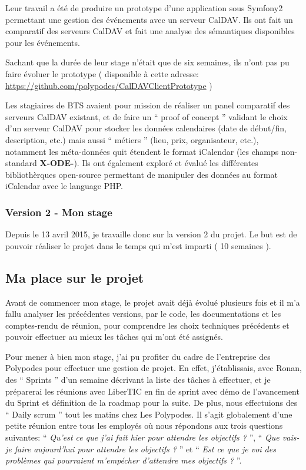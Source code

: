 Leur travail a été de produire un prototype d'une application sous Symfony2 permettant une gestion des événements avec un serveur CalDAV. Ils ont fait un comparatif des serveurs CalDAV et fait une analyse des sémantiques disponibles pour les événements.

Sachant que la durée de leur stage n'était que de six semaines, ils n'ont pas pu faire évoluer le prototype ( disponible à cette adresse: \url{https://github.com/polypodes/CalDAVClientPrototype} )

Les stagiaires de BTS avaient pour mission de réaliser un panel comparatif des serveurs CalDAV existant, et de faire un `` proof of concept '' validant le choix d'un serveur CalDAV pour stocker les données calendaires (date de début/fin, description, etc.) mais aussi `` métiers '' (lieu, prix, organisateur, etc.), notamment les méta-données quit étendent le format iCalendar (les champs non-standard \textbf{X-ODE-}). Ils ont également exploré et évalué les différentes bibliothèrques open-source permettant de manipuler des données au format iCalendar avec le language PHP.

\subsubsection*{Version 2 - Mon stage}

Depuis le 13 avril 2015, je travaille donc sur la version 2 du projet. Le but est de pouvoir réaliser le projet dans le temps qui m'est imparti ( 10 semaines ).

\subsection{Ma place sur le projet}

Avant de commencer mon stage, le projet avait déjà évolué plusieurs fois et il m'a fallu analyser les précédentes versions, par le code, les documentations et les comptes-rendu de réunion, pour comprendre les choix techniques précédents et pouvoir effectuer au mieux les tâches qui m'ont été assignés.

Pour mener à bien mon stage, j'ai pu profiter du cadre de l'entreprise des Polypodes pour effectuer une gestion de projet. En effet, j'établissais, avec Ronan, des `` Sprints '' d'un semaine décrivant la liste des tâches à effectuer, et je préparerai les réunions avec LiberTIC en fin de sprint avec démo de l'avancement du Sprint et définition de la roadmap pour la suite. De plus, nous effectuions des `` Daily scrum '' tout les matins chez Les Polypodes. Il s'agit globalement d'une petite réunion entre tous les employés où nous répondons aux trois questions suivantes: `` \textit{Qu'est ce que j'ai fait hier pour attendre les objectifs ?} '', `` \textit{Que vais-je faire aujourd'hui pour attendre les objectifs ?} '' et `` \textit{Est ce que je voi des problèmes qui pourraient m'empécher d'attendre mes objectifs ?} ''.

